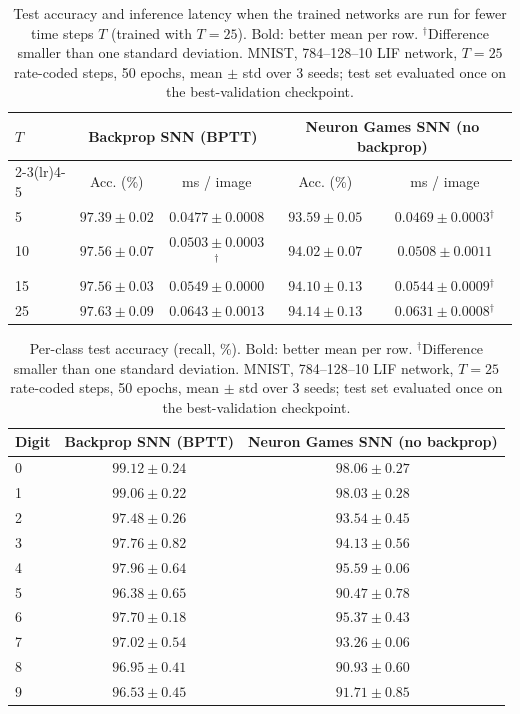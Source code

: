 \begin{table}[t]
\centering
\small
\caption{Test accuracy and inference latency when the trained networks are run for fewer time steps $T$ (trained with $T=25$). Bold: better mean per row. $^\dagger$Difference smaller than one standard deviation. MNIST, 784--128--10 LIF network, $T=25$ rate-coded steps, 50 epochs, mean $\pm$ std over 3 seeds; test set evaluated once on the best-validation checkpoint.}
\label{tab:ng-steps}
\begin{tabular}{lcccc}
\toprule
\multirow{2}{*}{$T$} & \multicolumn{2}{c}{Backprop SNN (BPTT)} & \multicolumn{2}{c}{Neuron Games SNN (no backprop)} \\
\cmidrule(lr){2-3}\cmidrule(lr){4-5}
 & Acc. (\%) & ms / image & Acc. (\%) & ms / image \\
\midrule
5 & $\boldsymbol{97.39 \pm 0.02}$ & $0.0477 \pm 0.0008$ & $93.59 \pm 0.05$ & $\boldsymbol{0.0469 \pm 0.0003}$$^\dagger$ \\
10 & $\boldsymbol{97.56 \pm 0.07}$ & $\boldsymbol{0.0503 \pm 0.0003}$$^\dagger$ & $94.02 \pm 0.07$ & $0.0508 \pm 0.0011$ \\
15 & $\boldsymbol{97.56 \pm 0.03}$ & $0.0549 \pm 0.0000$ & $94.10 \pm 0.13$ & $\boldsymbol{0.0544 \pm 0.0009}$$^\dagger$ \\
25 & $\boldsymbol{97.63 \pm 0.09}$ & $0.0643 \pm 0.0013$ & $94.14 \pm 0.13$ & $\boldsymbol{0.0631 \pm 0.0008}$$^\dagger$ \\
\bottomrule
\end{tabular}
\end{table}

\begin{table}[t]
\centering
\small
\caption{Per-class test accuracy (recall, \%). Bold: better mean per row. $^\dagger$Difference smaller than one standard deviation. MNIST, 784--128--10 LIF network, $T=25$ rate-coded steps, 50 epochs, mean $\pm$ std over 3 seeds; test set evaluated once on the best-validation checkpoint.}
\label{tab:ng-per-class}
\begin{tabular}{lcc}
\toprule
Digit & Backprop SNN (BPTT) & Neuron Games SNN (no backprop) \\
\midrule
0 & $\boldsymbol{99.12 \pm 0.24}$ & $98.06 \pm 0.27$ \\
1 & $\boldsymbol{99.06 \pm 0.22}$ & $98.03 \pm 0.28$ \\
2 & $\boldsymbol{97.48 \pm 0.26}$ & $93.54 \pm 0.45$ \\
3 & $\boldsymbol{97.76 \pm 0.82}$ & $94.13 \pm 0.56$ \\
4 & $\boldsymbol{97.96 \pm 0.64}$ & $95.59 \pm 0.06$ \\
5 & $\boldsymbol{96.38 \pm 0.65}$ & $90.47 \pm 0.78$ \\
6 & $\boldsymbol{97.70 \pm 0.18}$ & $95.37 \pm 0.43$ \\
7 & $\boldsymbol{97.02 \pm 0.54}$ & $93.26 \pm 0.06$ \\
8 & $\boldsymbol{96.95 \pm 0.41}$ & $90.93 \pm 0.60$ \\
9 & $\boldsymbol{96.53 \pm 0.45}$ & $91.71 \pm 0.85$ \\
\bottomrule
\end{tabular}
\end{table}

